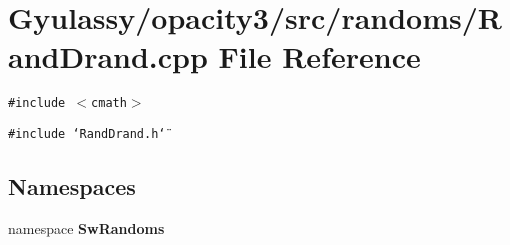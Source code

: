 \section{Gyulassy/opacity3/src/randoms/RandDrand.cpp File Reference}
\label{RandDrand_8cpp}
{\tt \#include $<$cmath$>$}\par
{\tt \#include \char`\"{}RandDrand.h\char`\"{}}\par
\subsection*{Namespaces}
\begin{CompactItemize}
\item 
namespace {\bf SwRandoms}
\end{CompactItemize}
